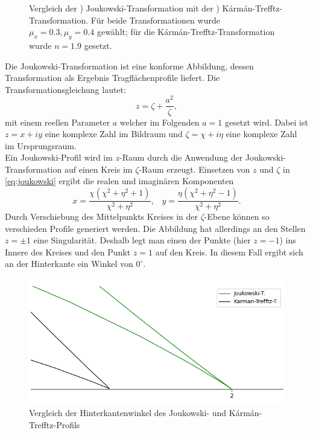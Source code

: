 \begin{figure}[]
\begin{subfigure}[b]{0.5\linewidth}
    \caption{\label{fig:karmantrefftztrans}}
  \end{subfigure}
  \caption{Vergleich der ) Joukowski-Transformation mit der ) Kármán-Trefftz-Transformation. Für beide Transformationen wurde $\mu_x = 0.3, \mu_y =0.4$ gewählt; für die Kármán-Trefftz-Transformation wurde $n=1.9$ gesetzt.\label{fig:joukar}}
\end{figure}
Die Joukowski-Transformation ist eine konforme Abbildung, dessen Transformation als Ergebnis Tragflächenprofile liefert. Die Transformationsgleichung lautet:
\begin{equation}
\label{eq:joukowski}
z = \zeta + \frac{a^2}{\zeta},
\end{equation}
mit einem reellen Parameter $a$ welcher im Folgenden $a=1$ gesetzt wird. Dabei ist $z = x + iy$ eine komplexe Zahl im Bildraum und $\zeta = \chi + i \eta$ eine komplexe Zahl im Ursprungsraum. \\
Ein Joukowski-Profil wird im $z$-Raum durch die Anwendung der Joukowski-Transformation auf einen Kreis im $\zeta$-Raum erzeugt. Einsetzen von $z$ und $\zeta$ in \eqref{eq:joukowski} ergibt die realen und imaginären Komponenten
\begin{equation}
x={\frac {\chi \left(\chi ^{2}+\eta ^{2}+1\right)}{\chi ^{2}+\eta ^{2}}}, \;\;\; y={\frac {\eta \left(\chi ^{2}+\eta ^{2}-1\right)}{\chi ^{2}+\eta ^{2}}}.
\end{equation}
Durch Verschiebung des Mittelpunkts Kreises in der $\zeta$-Ebene können so verschieden Profile generiert werden. Die Abbildung hat allerdings an den Stellen $z = \pm 1$ eine Singularität. Deshalb legt man einen der Punkte (hier $z = -1$) ins Innere des Kreises und den Punkt $z=1$ auf den Kreis. In diesem Fall ergibt sich an der Hinterkante ein Winkel von $0^{\circ}$. \\
\begin{figure}[!ht]
\begin{center} \includegraphics[scale=0.5]{figures/zoomedjouk.png} \end{center}
\caption{Vergleich der Hinterkantenwinkel des Joukowski- und Kármán-Trefftz-Profils}
\label{fig:zoomedjouk}
\end{figure}
